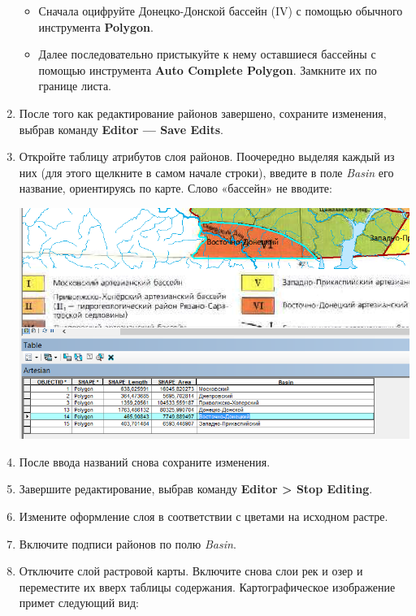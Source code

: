 \documentclass[]{book}
\theoremstyle{definition}
\theoremstyle{definition}
\theoremstyle{definition}
\theoremstyle{remark}
\begin{document}
\begin{enumerate}
  \begin{itemize}
  \item
    Сначала оцифруйте Донецко-Донской бассейн (IV) с помощью обычного
    инструмента \textbf{Polygon}.
  \item
    Далее последовательно пристыкуйте к нему оставшиеся бассейны с
    помощью инструмента \textbf{Auto Complete Polygon}. Замкните их по
    границе листа.
  \end{itemize}
\item
  После того как редактирование районов завершено, сохраните изменения,
  выбрав команду \textbf{Editor --- Save Edits}.
\item
  Откройте таблицу атрибутов слоя районов. Поочередно выделяя каждый из
  них (для этого щелкните в самом начале строки), введите в поле
  \emph{Basin} его название, ориентируясь по карте. Слово «бассейн» не
  вводите:

  \includegraphics{images/Ex05/image13.png}
\item
  После ввода названий снова сохраните изменения.
\item
  Завершите редактирование, выбрав команду \textbf{Editor \textgreater{}
  Stop Editing}.
\item
  Измените оформление слоя в соответствии с цветами на исходном растре.
\item
  Включите подписи районов по полю \emph{Basin}.
\item
  Отключите слой растровой карты. Включите снова слои рек и озер и
  переместите их вверх таблицы содержания. Картографическое изображение
  примет следующий вид:


\end{enumerate}
\end{document}
